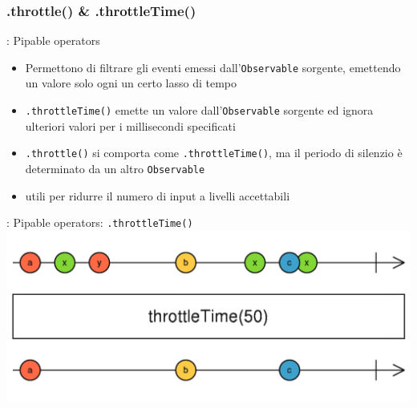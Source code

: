             \subsubsection{.throttle() \& .throttleTime()}\label{subsub:throttle}

            \begin{frame}{\insertsubsectionhead}{: Pipable operators}
                \begin{block}{\texttt{\insertsubsubsectionhead}}
                    \begin{itemize}
                        \item
                            Permettono di filtrare gli eventi emessi dall'\texttt{Observable} sorgente, emettendo un valore solo ogni un certo lasso di tempo
                        \item
                            \texttt{.throttleTime()} emette un valore dall'\texttt{Observable} sorgente ed ignora ulteriori valori per i millisecondi specificati
                        \item
                            \texttt{.throttle()} si comporta come \texttt{.throttleTime()}, ma il periodo di silenzio è determinato da un altro \texttt{Observable}
                        \item
                            utili per ridurre il numero di input a livelli accettabili
                    \end{itemize}
                \end{block}
            \end{frame}

            \begin{frame}[fragile]{\insertsubsectionhead}{: Pipable operators: \texttt{.throttleTime()}}
                \includegraphics[width=\linewidth]{throttleTime}
            \end{frame}

